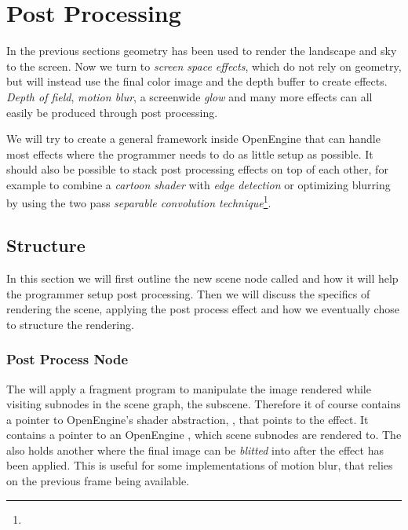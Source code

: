 \chapter{Post Processing}
\label{chap:pp}


In the previous sections geometry has been used to render the
landscape and sky to the screen. Now we turn to \emph{screen space
  effects}, which do not rely on geometry, but will instead use the
final color image and the depth buffer to create effects. \emph{Depth
  of field}, \emph{motion blur}, a screenwide \emph{glow} and many
more effects can all easily be produced through post processing.


We will try to create a general framework inside OpenEngine that can
handle most effects where the programmer needs to do as little setup
as possible. It should also be possible to stack post processing
effects on top of each other, for example to combine a \emph{cartoon
  shader} with \emph{edge detection} or optimizing blurring by using
the two pass \emph{separable convolution
  technique}\footnote{{}}.

\section{Structure}

In this section we will first outline the new scene node called
 and how it will help the programmer setup post
processing. Then we will discuss the specifics of rendering the scene,
applying the post process effect and how we eventually chose to
structure the rendering.

\subsection*{Post Process Node}

The  will apply a fragment program to
manipulate the image rendered while visiting subnodes in the scene
graph, the subscene. Therefore it of course contains a pointer to
OpenEngine's shader abstraction, , that points
to the effect. It contains a pointer to an OpenEngine
, which scene subnodes are rendered to. The
 also holds another  where
the final image can be \emph{blitted} into after the effect has been
applied. This is useful for some implementations of motion blur, that
relies on the previous frame being available.

